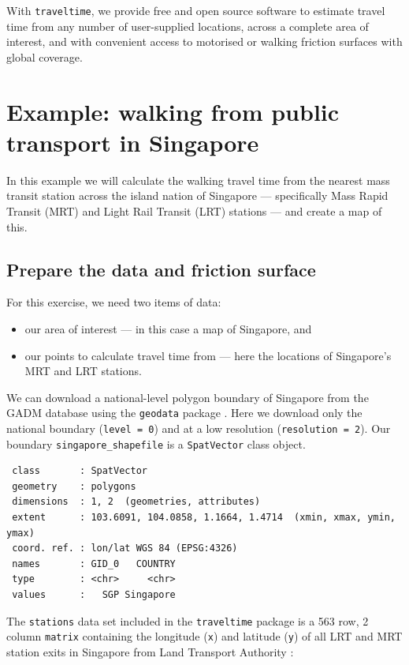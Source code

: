 \documentclass[
  10pt,
  letterpaper,
]{article}
\providecommand{\tightlist}{%
  \setlength{\itemsep}{0pt}\setlength{\parskip}{0pt}}\usepackage{longtable,booktabs,array}
\begin{document}
With \texttt{traveltime}, we provide free and open source software to
estimate travel time from any number of user-supplied locations, across
a complete area of interest, and with convenient access to motorised or
walking friction surfaces with global coverage.

\section{Example: walking from public transport in
Singapore}\label{example-walking-from-public-transport-in-singapore}

In this example we will calculate the walking travel time from the
nearest mass transit station across the island nation of Singapore ---
specifically Mass Rapid Transit (MRT) and Light Rail Transit (LRT)
stations --- and create a map of this.

\subsection{Prepare the data and friction
surface}\label{prepare-the-data-and-friction-surface}

For this exercise, we need two items of data:

\begin{itemize}
\tightlist
\item
  our area of interest --- in this case a map of Singapore, and
\item
  our points to calculate travel time from --- here the locations of
  Singapore's MRT and LRT stations.
\end{itemize}

We can download a national-level polygon boundary of Singapore from the
GADM \citep{gadm} database using the \texttt{geodata} package
\citep{geodata}. Here we download only the national boundary
(\texttt{level\ =\ 0}) and at a low resolution
(\texttt{resolution\ =\ 2}). Our boundary \texttt{singapore\_shapefile}
is a \texttt{SpatVector} class object.

\begin{verbatim}
 class       : SpatVector 
 geometry    : polygons 
 dimensions  : 1, 2  (geometries, attributes)
 extent      : 103.6091, 104.0858, 1.1664, 1.4714  (xmin, xmax, ymin, ymax)
 coord. ref. : lon/lat WGS 84 (EPSG:4326) 
 names       : GID_0   COUNTRY
 type        : <chr>     <chr>
 values      :   SGP Singapore
\end{verbatim}

The \texttt{stations} data set included in the \texttt{traveltime}
package is a 563 row, 2 column \texttt{matrix} containing the longitude
(\texttt{x}) and latitude (\texttt{y}) of all LRT and MRT station exits
in Singapore from Land Transport Authority \citep{singdata}:
\end{document}
